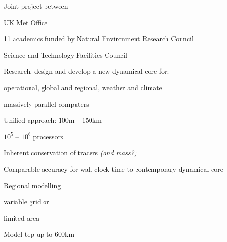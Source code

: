 \begin{slide}

\begin{list0}

\item Joint project between
    \begin{list1}
    \item UK Met Office
    \item 11 academics funded by Natural Environment Research Council
    \item Science and Technology Facilities Council\pauseHS
    \end{list1}

\item Research, design and develop a new dynamical core for:
    \begin{list1}
    \item operational, global and regional, weather and climate
    \item massively parallel computers\pauseHS
    \end{list1}
\end{list0}


\begin{list0}
\item Unified approach: 100m -- 150km\pauseHS
\item $10^5$ -- $10^6$ processors\pauseHS
\item Inherent conservation of tracers {\color{purple}\it (and mass?)}\pauseHS
\item Comparable accuracy for wall clock time to contemporary dynamical core\pauseHS
\item Regional modelling
    \begin{list1}
    \item variable grid or
    \item limited area\pauseHS
    \end{list1}
\item Model top up to 600km
\end{list0}

\end{slide}

